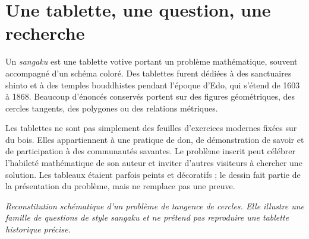 


\section*{Une tablette, une question, une recherche}
Un \emph{sangaku} est une tablette votive portant un problème mathématique, souvent accompagné d'un schéma coloré. Des tablettes furent dédiées à des sanctuaires shinto et à des temples bouddhistes pendant l'époque d'Edo, qui s'étend de 1603 à 1868. Beaucoup d'énoncés conservés portent sur des figures géométriques, des cercles tangents, des polygones ou des relations métriques.

Les tablettes ne sont pas simplement des feuilles d'exercices modernes fixées sur du bois. Elles appartiennent à une pratique de don, de démonstration de savoir et de participation à des communautés savantes. Le problème inscrit peut célébrer l'habileté mathématique de son auteur et inviter d'autres visiteurs à chercher une solution. Les tableaux étaient parfois peints et décoratifs ; le dessin fait partie de la présentation du problème, mais ne remplace pas une preuve.

\begin{center}
\end{center}
\textit{Reconstitution schématique d'un problème de tangence de cercles. Elle illustre une famille de questions de style sangaku et ne prétend pas reproduire une tablette historique précise.}

